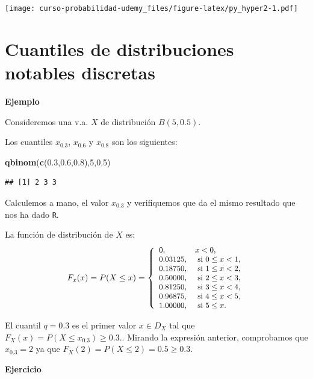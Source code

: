 \documentclass[]{book}
\newenvironment{Shaded}{\begin{snugshade}}{\end{snugshade}}
\newcommand{\DecValTok}[1]{\textcolor[rgb]{0.00,0.00,0.81}{#1}}
\newcommand{\FloatTok}[1]{\textcolor[rgb]{0.00,0.00,0.81}{#1}}
\newcommand{\KeywordTok}[1]{\textcolor[rgb]{0.13,0.29,0.53}{\textbf{#1}}}
\newcommand{\NormalTok}[1]{#1}
\begin{document}
\texttt{[image: curso-probabilidad-udemy\_files/figure-latex/py\_hyper2-1.pdf]}

\hypertarget{cuantiles-de-distribuciones-notables-discretas}{%
\section{Cuantiles de distribuciones notables discretas}\label{cuantiles-de-distribuciones-notables-discretas}}

\textbf{Ejemplo}

Consideremos una v.a. \(X\) de distribución \(B(5,0.5)\).

Los cuantiles \(x_{0.3}\), \(x_{0.6}\) y \(x_{0.8}\) son los siguientes:

\begin{Shaded}
\begin{Highlighting}[]
\KeywordTok{qbinom}\NormalTok{(}\KeywordTok{c}\NormalTok{(}\FloatTok{0.3}\NormalTok{,}\FloatTok{0.6}\NormalTok{,}\FloatTok{0.8}\NormalTok{),}\DecValTok{5}\NormalTok{,}\FloatTok{0.5}\NormalTok{)}
\end{Highlighting}
\end{Shaded}

\begin{verbatim}
## [1] 2 3 3
\end{verbatim}

Calculemos a mano, el valor \(x_{0.3}\) y verifiquemos que da el mismo resultado que nos ha dado \texttt{R}.

La función de distribución de \(X\) es:
\[
\small{
F_x(x)=P(X\leq x)=
\left\{
\begin{array}{ll}
0, & x< 0, \\
0.03125, & \mbox{ si } 0 \leq x< 1, \\
0.18750, & \mbox{ si } 1 \leq x< 2, \\
0.50000, & \mbox{ si } 2 \leq x< 3, \\
0.81250, & \mbox{ si } 3 \leq x< 4, \\
0.96875, & \mbox{ si } 4 \leq x< 5, \\
1.00000, & \mbox{ si }  5\leq x. \\
\end{array}
\right.}
\]

El cuantil \(q=0.3\) es el primer valor \(x\in D_X\) tal que \(F_X(x)=P(X\leq x_{0.3})\geq 0.3.\). Mirando la expresión anterior, comprobamos que \(x_{0.3}=2\) ya que \(F_X(2)=P(X\leq 2)=0.5 \geq 0.3\).

\textbf{Ejercicio}
\end{document}
